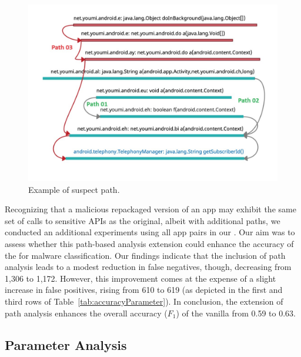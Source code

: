 \begin{figure}
\centering
\includegraphics[scale=0.28]{images/maliciousTrace_example01.pdf}
\caption{Example of suspect path.}
 \label{fig:maliciousTrace}
\end{figure}

Recognizing that a malicious repackaged version of an app may exhibit the same set of calls
to sensitive APIs as the original, albeit with additional paths, we conducted an additional experiments
using all app pairs in our \cds. Our aim was to assess whether this path-based analysis extension could enhance
the accuracy of the \mas for malware classification. Our findings indicate that the inclusion of path analysis
leads to a modest reduction in false negatives, though, decreasing from 1,306 to 1,172.
However, this improvement comes at the expense of a slight increase in false positives, rising from 610 to 619
(as depicted in the first and third rows of Table~\ref{tab:accuracyParameter}).
In conclusion, the extension of path analysis enhances the overall accuracy ($F_1$) of the vanilla
\mas from 0.59 to 0.63.

\subsection{Parameter Analysis}

